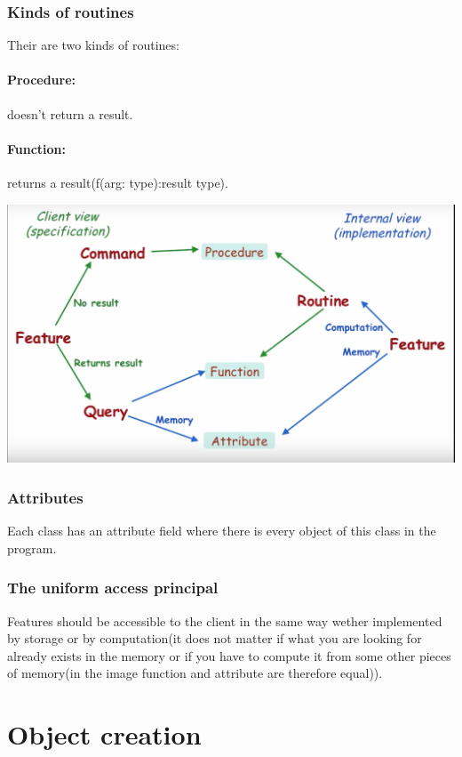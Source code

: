 \documentclass[11pt]{article}
\newcommand\back[1][-3cm]{\hspace*{#1}}
\begin{document}
\subsubsection{Kinds of routines}
Their are two kinds of routines:\paragraph{Procedure:} doesn't return a result.\paragraph{Function:} returns a result(f(arg: type):result type).\\
\begin{center}
	\back\includegraphics[width = 18cm]{feature}
\end{center}

\subsubsection{Attributes}
Each class has an attribute field where there is every object of this class in the program.
\subsubsection{The uniform access principal}
Features should be accessible to the client in the same way wether implemented by storage or by computation(it does not matter if what you are looking for already exists in the memory or if you have to compute it from some other pieces of memory(in the image function and attribute are therefore equal)). 
\section{Object creation}
\end{document}
